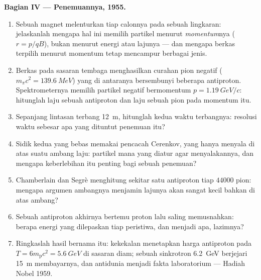 \begin{problem}
\medskip\noindent\textbf{Bagian IV --- Penemuannya, 1955.}
\begin{enumerate}[resume]
  \item Sebuah magnet melenturkan tiap calonnya pada sebuah lingkaran:
        jelaskanlah mengapa hal ini memilih partikel menurut
        \emph{momentum}nya ($r = p/qB$), bukan menurut energi atau
        lajunya --- dan mengapa berkas terpilih menurut momentum tetap
        mencampur berbagai jenis.
  \item Berkas pada sasaran tembaga menghasilkan curahan pion negatif
        ($m_\pi c^2 = \qty{139.6}{MeV}$) yang di antaranya bersembunyi
        beberapa antiproton. Spektrometernya memilih partikel negatif
        bermomentum $p = \qty{1.19}{GeV}/c$: hitunglah laju sebuah
        antiproton dan laju sebuah pion pada momentum itu.
  \item Sepanjang lintasan terbang \qty{12}{m}, hitunglah kedua waktu
        terbangnya: resolusi waktu sebesar apa yang dituntut penemuan
        itu?
  \item Sidik kedua yang bebas memakai pencacah Cerenkov, yang hanya
        menyala di atas suatu ambang laju: partikel mana yang diatur
        agar menyalakannya, dan mengapa keberlebihan itu penting bagi
        sebuah penemuan?
  \item Chamberlain dan Segrè menghitung sekitar satu antiproton tiap
        $\num{44000}$ pion: mengapa argumen ambangnya menjamin lajunya
        akan sangat kecil bahkan di atas ambang?
  \item Sebuah antiproton akhirnya bertemu proton lalu saling
        memusnahkan: berapa energi yang dilepaskan tiap peristiwa, dan
        menjadi apa, lazimnya?
  \item Ringkaslah hasil bernama itu: kekekalan 
        menetapkan harga antiproton pada $T = 6m_{\text{p}}c^2 =
        \qty{5.6}{GeV}$ di sasaran diam; sebuah sinkrotron
        \qty{6.2}{GeV} berjejari \qty{15}{m} membayarnya, dan antidunia
        menjadi fakta laboratorium --- Hadiah Nobel 1959.
\end{enumerate}
\end{problem}

